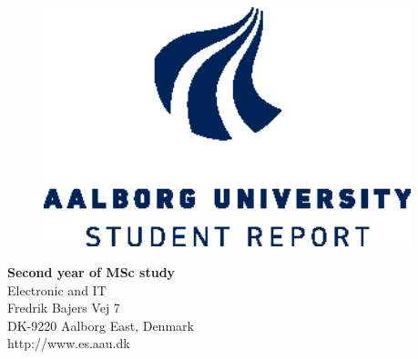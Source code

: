 {}
\thispagestyle{empty}

\begin{minipage}[t]{0.48\textwidth}
\vspace*{-25pt}			%

\begin{figure}[H] 
\includegraphics[width=0.95\textwidth]{rapport/introduction/aau_logo2}
\end{figure} 
\end{minipage}
\hfill
\begin{minipage}[t]{0.48\textwidth}
{\small 
\textbf{Second year of MSc study}  \\
Electronic and IT \\
Fredrik Bajers Vej 7 \\
DK-9220 Aalborg East, Denmark\\
http://www.es.aau.dk}
\end{minipage}


\vspace*{1cm}

